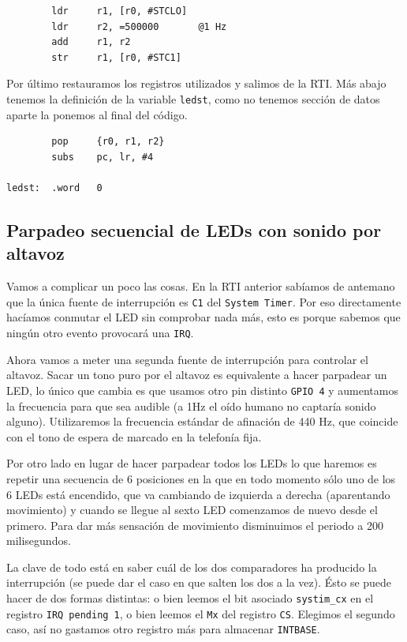 \begin{lstlisting}
        ldr     r1, [r0, #STCLO]
        ldr     r2, =500000       @1 Hz
        add     r1, r2
        str     r1, [r0, #STC1]
\end{lstlisting}

Por último restauramos los registros utilizados y salimos de la RTI. Más abajo tenemos la
definición de la variable {\tt ledst}, como no tenemos sección de datos aparte la ponemos
al final del código.

\begin{lstlisting}
        pop     {r0, r1, r2}
        subs    pc, lr, #4

ledst:  .word   0
\end{lstlisting}

\subsection{Parpadeo secuencial de LEDs con sonido por altavoz}

Vamos a complicar un poco las cosas. En la RTI anterior sabíamos de antemano que la única fuente
de interrupción es {\tt C1} del {\tt System Timer}. Por eso directamente hacíamos conmutar el
LED sin comprobar nada más, esto es porque sabemos que ningún otro evento provocará una {\tt IRQ}.

Ahora vamos a meter una segunda fuente de interrupción para controlar el altavoz. Sacar un tono
puro por el altavoz es equivalente a hacer parpadear un LED, lo único que cambia es que usamos
otro pin distinto {\tt GPIO 4} y aumentamos la frecuencia para que sea audible (a 1Hz el oído
humano no captaría sonido alguno). Utilizaremos la frecuencia estándar de afinación
de 440 Hz, que coincide con el tono de espera de marcado en la telefonía fija.

Por otro lado en lugar de hacer parpadear todos los LEDs lo que haremos es repetir una
secuencia de 6 posiciones en la que en todo momento sólo uno de los 6 LEDs está encendido, que
va cambiando de izquierda a derecha (aparentando movimiento) y cuando se llegue al sexto LED
comenzamos de nuevo desde el primero. Para dar más sensación de movimiento disminuimos el periodo
a 200 milisegundos.

La clave de todo está en saber cuál de los dos comparadores ha producido la interrupción (se
puede dar el caso en que salten los dos a la vez). Ésto se puede hacer de dos formas distintas:
o bien leemos el bit asociado {\tt systim\_cx} en el registro {\tt IRQ pending 1}, o bien leemos
el {\tt Mx} del registro {\tt CS}. Elegimos el segundo caso, así no gastamos otro registro más
para almacenar {\tt INTBASE}.

